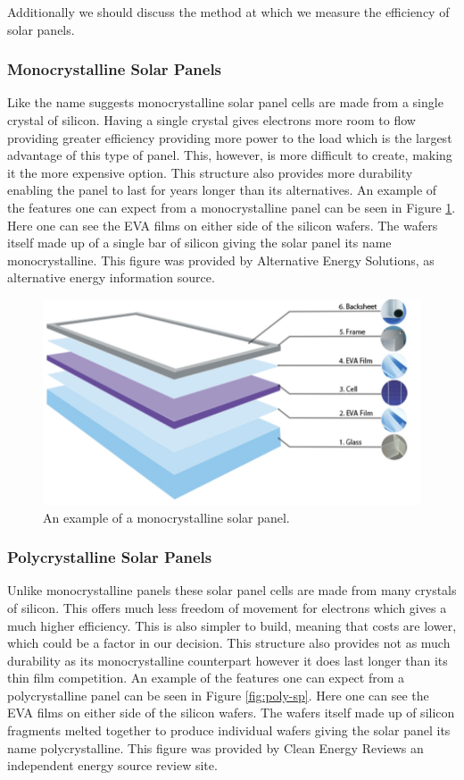 Additionally we should discuss the method at which we measure the efficiency of solar panels. 

\subsubsection{Monocrystalline Solar Panels}

Like the name suggests monocrystalline solar panel cells are made from a single crystal of silicon. Having a single crystal gives electrons more room to flow providing greater efficiency providing more power to the load which is the largest advantage of this type of panel. This, however, is more difficult to create, making it the more expensive option. This structure also provides more durability enabling the panel to last for years longer than its alternatives. An example of the features one can expect from a monocrystalline panel can be seen in Figure \ref{fig:mono-sp}. Here one can see the EVA films on either side of the silicon wafers. The wafers itself made up of a single bar of silicon giving the solar panel its name monocrystalline. This figure was provided by Alternative Energy Solutions, as alternative energy information source.

\begin{figure}
    \centering
    \includegraphics[scale=0.5]{figures/monocrystaline.png}
    \caption{An example of a monocrystalline solar panel.}
    \label{fig:mono-sp} 
\end{figure}

\subsubsection{Polycrystalline Solar Panels}
Unlike monocrystalline panels these solar panel cells are made from many crystals of silicon. This offers much less freedom of movement for electrons which gives a much higher efficiency. This is also simpler to build, meaning that costs are lower, which could be a factor in our decision. This structure also provides not as much durability as its monocrystalline counterpart however it does last longer than its thin film competition. An example of the features one can expect from a polycrystalline panel can be seen in Figure \ref{fig:poly-sp}. Here one can see the EVA films on either side of the silicon wafers. The wafers itself made up of silicon fragments melted together to produce individual wafers giving the solar panel its name polycrystalline. This figure was provided by Clean Energy Reviews an independent energy source review site.

